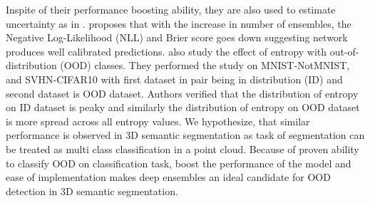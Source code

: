Inspite of their performance boosting ability, they are also used to estimate uncertainty as in \cite{lakshminarayanan2016simple}.
\cite{lakshminarayanan2016simple} proposes that with the increase in number of ensembles, the Negative Log-Likelihood (NLL) and Brier score goes down suggesting network produces well calibrated predictions.
\cite{lakshminarayanan2016simple} also study the effect of entropy with out-of-distribution (OOD) classes.
They performed the study on MNIST-NotMNIST, and SVHN-CIFAR10 with first dataset in pair being in distribution (ID) and second dataset is OOD dataset.
Authors verified that the distribution of entropy on ID dataset is peaky and similarly the distribution of entropy on OOD dataset is more spread across all entropy values.
We hypothesize, that similar performance is observed in 3D semantic segmentation as task of segmentation can be treated as multi class classification in a point cloud.
Because of proven ability to classify OOD on classification task, boost the performance of the model and ease of implementation makes deep ensembles an ideal candidate for OOD detection in 3D semantic segmentation.

